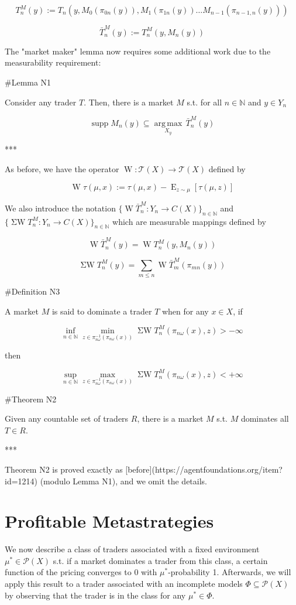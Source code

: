 \documentclass[a4paper]{article}
\DeclareMathOperator{\Supp}{supp}
\DeclareMathOperator{\E}{E}
\newcommand{\Argmax}[1]{\underset{#1}{\operatorname{arg\,max}}\,}
\newcommand{\Nats}{\mathbb{N}}
\newcommand{\Prob}{\mathcal{P}}
\newcommand{\T}{\mathcal{T}}
\newcommand{\W}{\operatorname{W}}
\newcommand{\SW}{\operatorname{\Sigma W}}
\begin{document}
$$T^M_n(y):= T_n(y, M_0(\pi_{0n}(y)),M_1(\pi_{1n}(y)) \ldots M_{n-1}(\pi_{n-1,n}(y)))$$

$$\bar{T}^M_n(y):= T^M_n(y,M_n(y))$$

The "market maker" lemma now requires some additional work due to the measurability requirement:

\#Lemma N1

Consider any trader ${T}$. Then, there is a market ${M}$ s.t. for all ${n \in \Nats}$ and ${y \in Y_n}$

$$\Supp M_n(y) \subseteq \Argmax{X_y} \bar{T}^M_n(y)$$

***

As before, we have the operator ${\W: \T(X) \rightarrow \T(X)}$ defined by 

$$\W \tau(\mu,x):= \tau(\mu,x) - \E_{z \sim \mu}[\tau(\mu,z)]$$

We also introduce the notation ${\{\W \bar{T}^M_n: Y_n \rightarrow C(X)\}_{n \in \Nats}}$ and ${\{\SW T^M_n: Y_n \rightarrow C(X)\}_{n \in \Nats}}$ which are measurable mappings defined by

$$\W \bar{T}^M_n(y) = \W T^M_n(y, M_n(y))$$

$$\SW T^M_n(y) = \sum_{m \leq n} \W \bar{T}^M_m(\pi_{mn}(y))$$

\#Definition N3

A market ${M}$ is said to dominate a trader ${T}$ when for any ${x \in X}$, if

$$\inf_{n \in \Nats} \min_{z \in \pi_{n\omega}^{-1}(\pi_{n\omega}(x))} \SW T^M_n(\pi_{n\omega}(x),z) > -\infty$$

then

$$\sup_{n \in \Nats} \max_{z \in \pi_{n\omega}^{-1}(\pi_{n\omega}(x))} \SW T^M_n(\pi_{n\omega}(x),z) < +\infty$$

\#Theorem N2

Given any countable set of traders $R$, there is a market ${M}$ s.t. ${M}$ dominates all ${T \in R}$.

***

Theorem N2 is proved exactly as [before](https://agentfoundations.org/item?id=1214) (modulo Lemma N1), and we omit the details.

\section{Profitable Metastrategies}

We now describe a class of traders associated with a fixed environment ${\mu^* \in \Prob(X)}$ s.t. if a market dominates a trader from this class, a certain function of the pricing converges to 0 with ${\mu^*}$-probability 1. Afterwards, we will apply this result to a trader associated with an incomplete models ${\Phi \subseteq \Prob(X)}$ by observing that the trader is in the class for any ${\mu^* \in \Phi}$.
\end{document}
